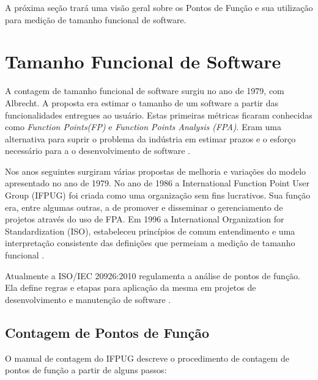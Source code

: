 A próxima seção trará uma visão geral sobre os Pontos de Função e sua utilização para medição de tamanho funcional de software.

\section{Tamanho Funcional de Software}

A contagem de tamanho funcional de software surgiu no ano de 1979, com Albrecht. A proposta era estimar o tamanho de um software a partir das funcionalidades entregues ao usuário. Estas primeiras métricas ficaram conhecidas como \textit{Function Points(FP)} e \textit{Function Points Analysis (FPA)}. Eram uma alternativa para suprir o problema da indústria em estimar prazos e o esforço necessário para a o desenvolvimento de software \cite{Gencel:2008}.

Nos anos seguintes surgiram várias propostas de melhoria e variações do modelo apresentado no ano de 1979. No ano de 1986 a International Function Point User Group (IFPUG) foi criada como uma organização sem fins lucrativos. Sua função era, entre algumas outras, a de promover e disseminar o gerenciamento de projetos através do uso de FPA. Em 1996 a International Organization for Standardization (ISO), estabeleceu princípios de comum entendimento e uma interpretação consistente das  definições que permeiam a medição de tamanho funcional \cite{Gencel:2008}.

Atualmente a ISO/IEC 20926:2010 regulamenta a análise de pontos de função. Ela define regras e etapas para aplicação da mesma em projetos de desenvolvimento e manutenção de software \cite{Marcos:2015}.

\subsection{Contagem de Pontos de Função}

O manual de contagem do IFPUG descreve o procedimento de contagem de pontos de função a partir de alguns passos: \cite{IFPUG:2010}

